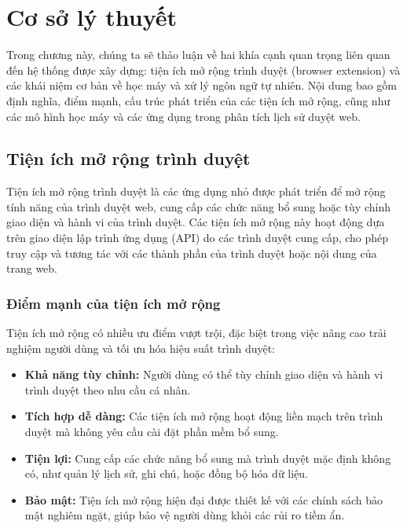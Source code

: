 \chapter{Cơ sở lý thuyết}
\label{chap:base_knowledge}

Trong chương này, chúng ta sẽ thảo luận về hai khía cạnh quan trọng liên quan đến hệ thống được xây dựng: tiện ích mở rộng trình duyệt (browser extension) và các khái niệm cơ bản về học máy và xử lý ngôn ngữ tự nhiên. Nội dung bao gồm định nghĩa, điểm mạnh, cấu trúc phát triển của các tiện ích mở rộng, cũng như các mô hình học máy và các ứng dụng trong phân tích lịch sử duyệt web.

\section{Tiện ích mở rộng trình duyệt}

Tiện ích mở rộng trình duyệt là các ứng dụng nhỏ được phát triển để mở rộng tính năng của trình duyệt web, cung cấp các chức năng bổ sung hoặc tùy chỉnh giao diện và hành vi của trình duyệt. Các tiện ích mở rộng này hoạt động dựa trên giao diện lập trình ứng dụng (API) do các trình duyệt cung cấp, cho phép truy cập và tương tác với các thành phần của trình duyệt hoặc nội dung của trang web.

\subsection{Điểm mạnh của tiện ích mở rộng}

Tiện ích mở rộng có nhiều ưu điểm vượt trội, đặc biệt trong việc nâng cao trải nghiệm người dùng và tối ưu hóa hiệu suất trình duyệt:
\begin{itemize}
    \item \textbf{Khả năng tùy chỉnh:} Người dùng có thể tùy chỉnh giao diện và hành vi trình duyệt theo nhu cầu cá nhân.
    \item \textbf{Tích hợp dễ dàng:} Các tiện ích mở rộng hoạt động liền mạch trên trình duyệt mà không yêu cầu cài đặt phần mềm bổ sung.
    \item \textbf{Tiện lợi:} Cung cấp các chức năng bổ sung mà trình duyệt mặc định không có, như quản lý lịch sử, ghi chú, hoặc đồng bộ hóa dữ liệu.
    \item \textbf{Bảo mật:} Tiện ích mở rộng hiện đại được thiết kế với các chính sách bảo mật nghiêm ngặt, giúp bảo vệ người dùng khỏi các rủi ro tiềm ẩn.
\end{itemize}

